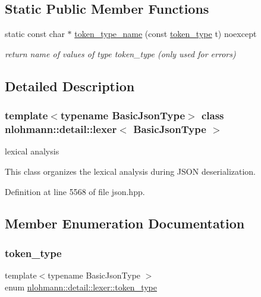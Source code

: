 \subsection*{Static Public Member Functions}
\begin{DoxyCompactItemize}
\item 
static const char $\ast$ \mbox{\hyperlink{classnlohmann_1_1detail_1_1lexer_ae514e2005f0ce185f1ad366139e541e8}{token\+\_\+type\+\_\+name}} (const \mbox{\hyperlink{classnlohmann_1_1detail_1_1lexer_a3f313cdbe187cababfc5e06f0b69b098}{token\+\_\+type}} t) noexcept
\begin{DoxyCompactList}\small\item\em return name of values of type token\+\_\+type (only used for errors) \end{DoxyCompactList}\end{DoxyCompactItemize}


\subsection{Detailed Description}
\subsubsection*{template$<$typename Basic\+Json\+Type$>$\newline
class nlohmann\+::detail\+::lexer$<$ Basic\+Json\+Type $>$}

lexical analysis 

This class organizes the lexical analysis during J\+S\+ON deserialization. 

Definition at line 5568 of file json.\+hpp.



\subsection{Member Enumeration Documentation}
\mbox{\label{classnlohmann_1_1detail_1_1lexer_a3f313cdbe187cababfc5e06f0b69b098}} 
\subsubsection{\texorpdfstring{token\_type}{token\_type}}
{\footnotesize\ttfamily template$<$typename Basic\+Json\+Type $>$ \\
enum \mbox{\hyperlink{classnlohmann_1_1detail_1_1lexer_a3f313cdbe187cababfc5e06f0b69b098}{nlohmann\+::detail\+::lexer\+::token\+\_\+type}}\hspace{0.3cm}{\ttfamily [strong]}}



